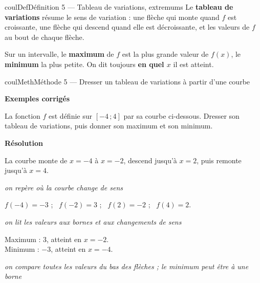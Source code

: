 \documentclass[11pt,a4paper]{article}
\makeatletter
\newcommand{\lycee@repere}[4]{%
  \draw[grille,step=1] (#1,#2) grid (#3,#4);
  \draw[-{Stealth[length=2mm]},thick] (#1,0)--({#3+0.4},0) node[below left=-1pt]{$x$};
  \draw[-{Stealth[length=2mm]},thick] (0,#2)--(0,{#4+0.4}) node[below left=-1pt]{$y$};
  \node[below left,font=\scriptsize,inner sep=1.5pt] at (0,0) {$0$};}
\newcommand{\lycee@gradx}[1]{\foreach \k/\l in {#1}{%
  \draw (\k,0.07)--(\k,-0.07) node[below,font=\scriptsize,inner sep=1.5pt]{$\l$};}}
\newcommand{\lycee@grady}[1]{\foreach \k/\l in {#1}{%
  \draw (0.07,\k)--(-0.07,\k) node[left,font=\scriptsize,inner sep=1.5pt]{$\l$};}}
\newcommand{\lycee@intff}[2]{\left[#1\,;#2\right]}
\providecommand{\repere}{\lycee@repere}%
\providecommand{\gradx}{\lycee@gradx}%
\providecommand{\grady}{\lycee@grady}%
\providecommand{\Cf}{\mathcal{C}\sb{f}}%
\providecommand{\intff}{\lycee@intff}%
\newcounter{lycee@signet}
\newcommand{\signet}[3][]{\stepcounter{lycee@signet}%
  \edef\lycee@dest{\if\relax\detokenize{#1}\relax
    signet.\arabic{lycee@signet}\else#1\fi}%
  \hypertarget{\lycee@dest}{}\bookmark[level=#2,dest=\lycee@dest]{#3}}
\newcommand{\res}[1]{#1}
\newcounter{methode}
\newenvironment{definitionbox}[1][Définition]%
  {\begin{boitecours}[phantom={\signet{2}{#1}}]{coulDef}{#1}}{\end{boitecours}}
\newenvironment{methodebox}[1][Méthode]{\stepcounter{methode}%
  \begin{boitecours}[phantom={\signet[methode-\arabic{methode}]{2}{#1}}]{coulMeth}{#1}}%
  {\end{boitecours}}
\newcommand{\etape}[1]{\par\smallskip\textbf{\color{coulMeth}#1}\par\nobreak\smallskip}
\newcommand{\explique}[2]{\par\smallskip\noindent
  \begin{minipage}[t]{0.57\linewidth}\raggedright #1\end{minipage}\hfill
  \begin{minipage}[t]{0.40\linewidth}\raggedright\leavevmode
    {\small\itshape\color{black!60}#2}\end{minipage}\par}
\newcommand{\cas}[1]{\par\smallskip\noindent\textbf{\color{coulExo}#1}\vadjust{\nobreak}}
\newenvironment{correction}{\par}{\par}
\newcommand{\etapeexemples}{\etape{Exemples corrigés}}
\makeatother
\begin{document}
\begin{definitionbox}[Définition 5 --- Tableau de variations, extremums]
Le \textbf{tableau de variations} résume le sens de variation : une flèche qui monte
quand $f$ est croissante, une flèche qui descend quand elle est décroissante, et les
valeurs de $f$ au bout de chaque flèche.

\smallskip
Sur un intervalle, le \textbf{maximum} de $f$ est la plus grande valeur de $f(x)$, le
\textbf{minimum} la plus petite. On dit toujours \textbf{en quel $x$} il est atteint.
\end{definitionbox}

\begin{methodebox}[Méthode 5 --- Dresser un tableau de variations à partir d'une courbe]
\etapeexemples
La fonction $f$ est définie sur $\intff{-4}{4}$ par sa courbe ci-dessous. Dresser son
tableau de variations, puis donner son maximum et son minimum.
\begin{center}
\end{center}
\begin{correction}
\cas{Résolution}\par\nopagebreak
\explique{La courbe monte de $x=-4$ à $x=-2$, descend jusqu'à $x=2$, puis remonte
jusqu'à $x=4$.}{on repère où la courbe change de sens}
\explique{$f(-4)=-3$ ; \ $f(-2)=3$ ; \ $f(2)=-2$ ; \ $f(4)=2$.}{on lit les valeurs aux
bornes et aux changements de sens}
\begin{center}
\end{center}
\explique{Maximum : \res{$3$, atteint en $x=-2$}. \\ Minimum : \res{$-3$, atteint en $x=-4$}.}{on
compare toutes les valeurs du bas des flèches ; le minimum peut être à une borne}
\end{correction}


\end{methodebox}
\end{document}
